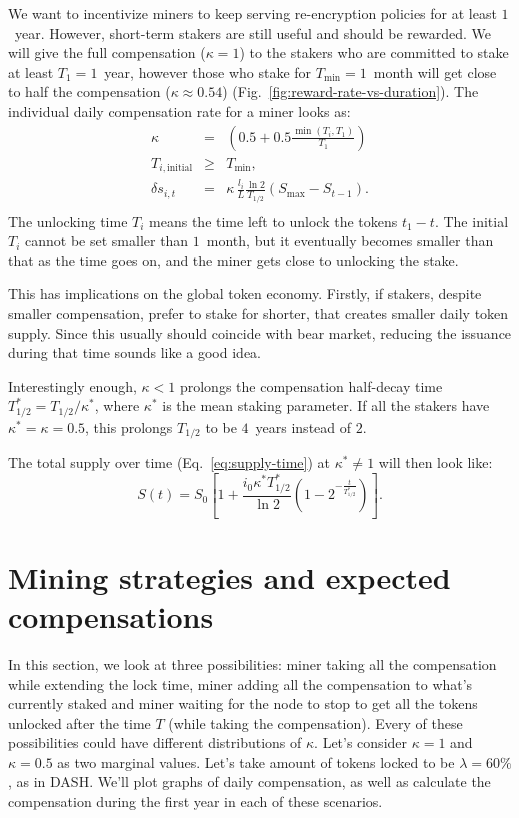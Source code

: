 \documentclass[longbibliography,nofootinbib,twocolumn]{revtex4-1}
\newcommand{\figref}[1]{Fig.~\ref{#1}}
\begin{document}
We want to incentivize miners to keep serving re-encryption policies for at least $1$~year.
However, short-term stakers are still useful and should be rewarded.
We will give the full compensation ($\kappa=1$) to the stakers who are committed to stake at least $T_1=1$~year,
however those who stake for $T_{\min}=1$~month will get close to half the compensation ($\kappa\approx0.54$) (\figref{fig:reward-rate-vs-duration}).
The individual daily compensation rate for a miner looks as:
\begin{eqnarray}
    \kappa &=& \left(0.5 + 0.5\frac{\min(T_i, T_1)}{T_1}\right)\\
    T_{i,\text{initial}} &\ge& T_{\min},\\
    \delta s_{i,t} &=&  \kappa\, \frac{l_i}{L} \frac{\ln{2}}{T_{1/2}} \left( S_{\max} - S_{t-1}\right).\\
\end{eqnarray}
The unlocking time $T_i$ means the time left to unlock the tokens $t_1 - t$.
The initial $T_i$ cannot be set smaller than $1$~month,
but it eventually becomes smaller than that as the time goes on, and the miner gets close to unlocking the stake.

This has implications on the global token economy.
Firstly, if stakers, despite smaller compensation, prefer to stake for shorter, that creates smaller daily token supply.
Since this usually should coincide with bear market, reducing the issuance during that time sounds like a good idea.

Interestingly enough, $\kappa < 1$ prolongs the compensation half-decay time $T_{1/2}^* = T_{1/2} / \kappa^*$, where $\kappa^*$ is the mean staking parameter.
If all the stakers have $\kappa^* = \kappa = 0.5$, this prolongs $T_{1/2}$ to be $4$~years instead of $2$.

The total supply over time (Eq.~\ref{eq:supply-time}) at $\kappa^* \ne 1$ will then look like:
\begin{equation}
    \label{eq:adjusted-supply-time}
    S(t) = S_0 \left[1 + \frac{i_0 \kappa^* T_{1/2}^*}{\ln{2}}\left(1 - 2^{-\frac{t}{T_{1/2}^*}} \right) \right].
\end{equation}

\section{Mining strategies and expected compensations}

In this section, we look at three possibilities:
miner taking all the compensation while extending the lock time,
miner adding all the compensation to what's currently staked
and miner waiting for the node to stop to get all the tokens unlocked after the time $T$ (while taking the compensation).
Every of these possibilities could have different distributions of $\kappa$.
Let's consider $\kappa=1$ and $\kappa=0.5$ as two marginal values.
Let's take amount of tokens locked to be $\lambda=60\%$, as in DASH.
We'll plot graphs of daily compensation, as well as calculate the compensation during the first year in each of these scenarios.
\end{document}
